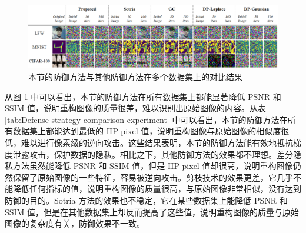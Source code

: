 \begin{figure}[htb]
    \centering
    \includegraphics[width=1.0 \textwidth]{figures/chapter4/contrast experiment.png}
    \caption{本节的防御方法与其他防御方法在多个数据集上的对比结果}
     \label{fig:Defense strategy comparison experiment}
\end{figure}

从图 \ref{fig:Defense strategy comparison experiment} 中可以看出，本节的防御方法在所有数据集上都能显著降低 PSNR 和 SSIM 值，说明重构图像的质量很差，难以识别出原始图像的内容。从表 \ref{tab:Defense strategy comparison experiment} 中可以看出，本节的防御方法在所有数据集上都能达到最低的 IIP-pixel 值，说明重构图像与原始图像的相似度很低，难以进行像素级的逆向攻击。这些结果表明，本节的防御方法能有效地抵抗梯度泄露攻击，保护数据的隐私。相比之下，其他防御方法的效果都不理想。差分隐私方法虽然能降低 PSNR 和 SSIM 值，但是 IIP-pixel 值却很高，说明重构图像仍然保留了原始图像的一些特征，容易被逆向攻击。剪枝技术的效果更差，它几乎不能降低任何指标的值，说明重构图像的质量很高，与原始图像非常相似，没有达到防御的目的。Sotria 方法的效果也不稳定，它在某些数据集上能降低 PSNR 和 SSIM 值，但是在其他数据集上却反而提高了这些值，说明重构图像的质量与原始图像的复杂度有关，防御效果不一致。

